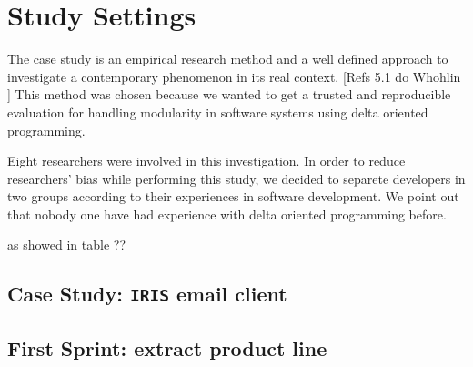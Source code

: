 \section{Study Settings}


% 

The case study is an empirical research method and a well defined approach to investigate a contemporary phenomenon in its real context. [Refs 5.1 do Whohlin ] This method was chosen because we wanted to get a trusted and reproducible evaluation for handling modularity in software systems using delta oriented programming.



Eight researchers were involved in this investigation. In order to reduce researchers’ bias while performing this study, we decided to separete developers in two groups according to their experiences in software development. We point out that nobody one have had experience with delta oriented programming before.

as  showed in table ??



\subsection{Case Study: \texttt{IRIS} email client}

%
%






\subsection{First Sprint: extract product line}

